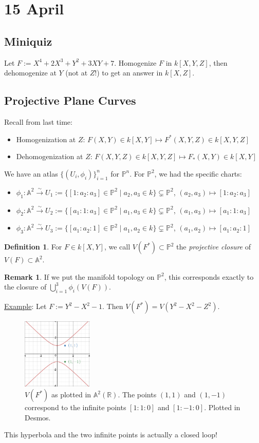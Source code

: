 \documentclass[12pt]{article}
\newcommand{\real}{\mathbb{R}}
\newcommand{\ita}[1]{\textit{#1}}
\theoremstyle{definition}
\newtheorem{definition}[theorem]{Definition}
\newtheorem*{remark}{Remark}
\begin{document}
\section{15 April}
\subsection{Miniquiz}
Let $F:=X^4+2X^3+Y^2+3XY+7$. Homogenize $F$ in $k[X,Y,Z]$, then dehomogenize at $Y$ (not at $Z$!) to get an answer in $k[X,Z]$.
\subsection{Projective Plane Curves}
Recall from last time:
\begin{itemize}
    \item Homogenization at $Z$: $F(X,Y)\in k[X,Y]\mapsto F^*(X,Y,Z)\in k[X,Y,Z]$
    \item Dehomogenization at $Z$: $F(X,Y,Z)\in k[X,Y,Z]\mapsto F_*(X,Y)\in k[X,Y]$
\end{itemize}
We have an atlas $\{(U_i,\phi_i)\}_{i=1}^n$ for $\mathbb{P}^n$. For $\mathbb{P}^2$, we had the specific charts:
\begin{itemize}
    \item $\phi_1:\mathbb{A}^2\stackrel{\sim}{\longrightarrow}U_1:=\{[1:a_2:a_3]\in\mathbb{P}^2\mid a_2,a_3\in k\}\subsetneq\mathbb{P}^2$, $(a_2,a_3)\mapsto[1:a_2:a_3]$
    \item $\phi_2:\mathbb{A}^2\stackrel{\sim}{\longrightarrow}U_2:=\{[a_1:1:a_3]\in\mathbb{P}^2\mid a_1,a_3\in k\}\subsetneq\mathbb{P}^2$, $(a_1,a_3)\mapsto[a_1:1:a_3]$
    \item $\phi_3:\mathbb{A}^2\stackrel{\sim}{\longrightarrow}U_3:=\{[a_1:a_2:1]\in\mathbb{P}^2\mid a_1,a_2\in k\}\subsetneq\mathbb{P}^2$, $(a_1,a_2)\mapsto[a_1:a_2:1]$
\end{itemize}
\begin{definition}
    For $F\in k[X,Y]$, we call $V(F^*)\subset\mathbb{P}^2$ the \ita{projective closure} of $V(F)\subset\mathbb{A}^2$.
\end{definition}
\begin{remark}
   If we put the manifold topology on $\mathbb{P}^2$, this corresponds exactly to the closure of $\bigcup\limits_{i=1}^3\phi_i(V(F))$.
\end{remark}
\underline{Example}: Let $F:=Y^2-X^2-1$. Then $V(F^*)=V(Y^2-X^2-Z^2)$. 
\begin{figure}[H]
    \centering
    \includegraphics[width=0.3\textwidth]{31.png}
    \caption{$V(F^*)$ as plotted in $\mathbb{A}^2(\real)$. The points $(1,1)$ and $(1,-1)$ correspond to the infinite points $[1:1:0]$ and $[1:-1:0]$. Plotted in Desmos.}
\end{figure}
This hyperbola and the two infinite points is actually a closed loop!
\end{document}
